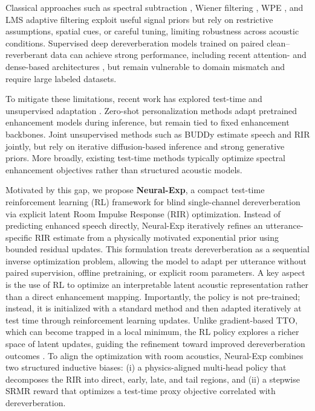 \documentclass[10pt,conference]{IEEEtran}
\begin{document}
Classical approaches such as spectral subtraction \cite{boll1979suppression}, Wiener filtering \cite{lim1979enhancement}, WPE \cite{nakatani2010speech,kinoshita2017neural}, and LMS adaptive filtering \cite{haykin2008adaptive} exploit useful signal priors but rely on restrictive assumptions, spatial cues, or careful tuning, limiting robustness across acoustic conditions. Supervised deep dereverberation models trained on paired clean--reverberant data \cite{8369155, han2015learning} can achieve strong performance, including recent attention- and dense-based architectures \cite{vaswani2017attention,pandey2022dense}, but remain vulnerable to domain mismatch and require large labeled datasets.

To mitigate these limitations, recent work has explored test-time and unsupervised adaptation \cite{wang2025systematic}. Zero-shot personalization methods \cite{Kim2024} adapt pretrained enhancement models during inference, but remain tied to fixed enhancement backbones. Joint unsupervised methods such as BUDDy \cite{10694254} estimate speech and RIR jointly, but rely on iterative diffusion-based inference and strong generative priors. More broadly, existing test-time methods typically optimize spectral enhancement objectives rather than structured acoustic models.

Motivated by this gap, we propose \textbf{Neural-Exp}, a compact test-time reinforcement learning (RL) framework for blind single-channel dereverberation via explicit latent Room Impulse Response (RIR) optimization. Instead of predicting enhanced speech directly, Neural-Exp iteratively refines an utterance-specific RIR estimate from a physically motivated exponential prior using bounded residual updates. This formulation treats dereverberation as a sequential inverse optimization problem, allowing the model to adapt per utterance without paired supervision, offline pretraining, or explicit room parameters. A key aspect is the use of RL to optimize an interpretable latent acoustic representation rather than a direct enhancement mapping. Importantly, the policy is not pre-trained; instead, it is initialized with a standard method and then adapted iteratively at test time through reinforcement learning updates. Unlike gradient-based TTO, which can become trapped in a local minimum, the RL policy explores a richer space of latent updates, guiding the refinement toward improved dereverberation outcomes \cite{8683648}. To align the optimization with room acoustics, Neural-Exp combines two structured inductive biases: (i) a physics-aligned multi-head policy that decomposes the RIR into direct, early, late, and tail regions, and (ii) a stepwise SRMR reward that optimizes a test-time proxy objective correlated with dereverberation.
\end{document}
